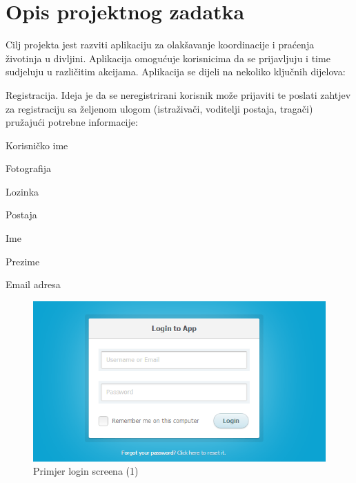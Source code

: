 \chapter{Opis projektnog zadatka}
		
Cilj projekta jest razviti aplikaciju za olakšavanje koordinacije i praćenja životinja u divljini. Aplikacija omogućuje korisnicima da se prijavljuju i time sudjeluju u različitim akcijama. Aplikacija se dijeli na nekoliko ključnih dijelova:\\

\begin{packed_item}
\item[1)]Registracija. Ideja je da se neregistrirani korisnik može prijaviti te poslati zahtjev za registraciju sa željenom ulogom (istraživači, voditelji postaja, tragači) pružajući potrebne informacije:

\begin{packed_item}
	\item[a)] Korisničko ime
	\item[b)] Fotografija
	\item[c)] Lozinka 
	\item[d)] Postaja 
	\item[e)] Ime 
	\item[f)] Prezime 
	\item[g)] Email adresa
	
\end{packed_item}

		\begin{figure}[H]
			\includegraphics[scale=0.4]{slike/login_screen.PNG} %
			\centering
			\caption{Primjer login screena (1)}
			\label{fig:promjene}
		\end{figure}
		

\end{packed_item}
